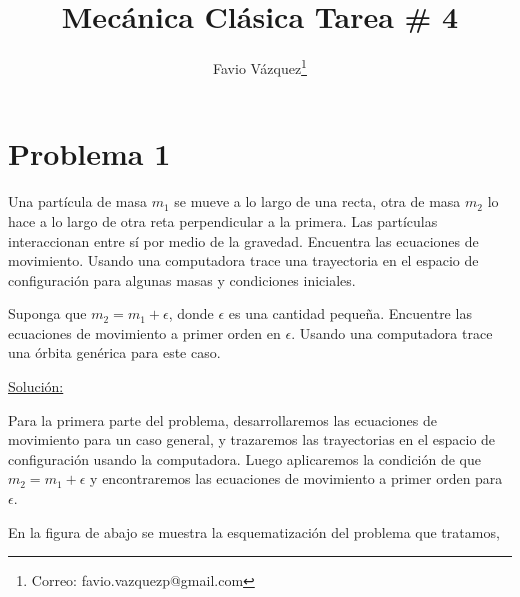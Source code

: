 \documentclass[a4paper,10pt]{article}
\title{Mecánica Clásica Tarea \# 4}
\author{Favio Vázquez\thanks{Correo: favio.vazquezp@gmail.com}}\affil{Instituto de Ciencias Nucleares. Universidad Nacional Autónoma de México.}
\date{}
\numberwithin{equation}{section}
\begin{document}
\makeatletter
\def\@maketitle{%
  \newpage
  \null
  \vskip 2em%
  \begin{center}%
  \let \footnote \thanks
    {\Large\bfseries \@title \par}%
    \vskip 1.5em%
    {\normalsize
      \lineskip .5em%
      \begin{tabular}[t]{c}%
        \@author
      \end{tabular}\par}%
    \vskip 1em%
    {\normalsize \@date}%
  \end{center}%
  \par
  \vskip 1.5em}
\makeatother

\maketitle

\section{Problema 1}

Una partícula de masa $m_1$ se mueve a lo largo de una recta, otra de masa $m_2$ lo 
hace a lo largo de otra reta perpendicular a la primera. Las partículas interaccionan 
entre sí por medio de la gravedad. Encuentra las ecuaciones de movimiento. Usando 
una computadora trace una trayectoria en el espacio de configuración para algunas 
masas y condiciones iniciales.

\vspace{.3cm}

Suponga que $m_2=m_1+\epsilon$, donde $\epsilon$ es una cantidad pequeña. Encuentre 
las ecuaciones de movimiento a primer orden en $\epsilon$. Usando una computadora 
trace una órbita genérica para este caso.

\vspace{.3cm}

\underline{Solución:} \vspace{.3cm}

Para la primera parte del problema, desarrollaremos las ecuaciones de movimiento 
para un caso general, y trazaremos las trayectorias en el espacio de configuración
usando la computadora. Luego aplicaremos la condición de que $m_2=m_1+\epsilon$ y 
encontraremos las ecuaciones de movimiento a primer orden para $\epsilon$.

\vspace{.3cm}

En la figura de abajo se muestra la esquematización del problema que tratamos,
\end{document}
